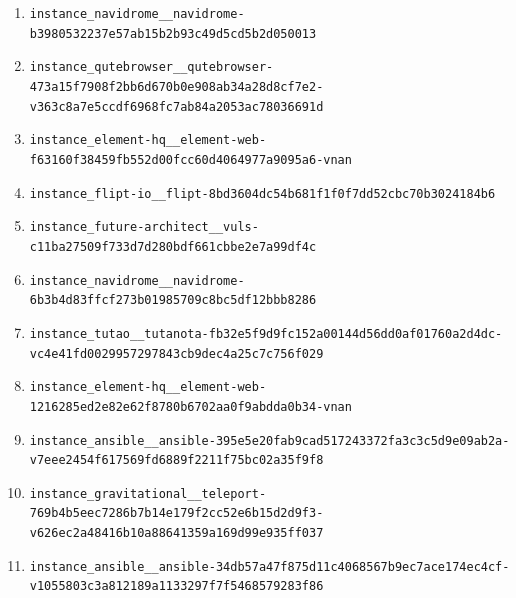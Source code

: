 \begin{enumerate}
\item \texttt{instance\_\allowbreak{}navidrome\_\allowbreak{}\_\allowbreak{}navidrome-\allowbreak{}b3980532237e57\allowbreak{}ab15b2b93c49d5\allowbreak{}cd5b2d050013}
\item \texttt{instance\_\allowbreak{}qutebrowser\_\allowbreak{}\_\allowbreak{}qutebrowser-\allowbreak{}473a15f7908f2b\allowbreak{}b6d670b0e908ab\allowbreak{}34a28d8cf7e2-\allowbreak{}v363c8a7e5ccdf\allowbreak{}6968fc7ab84a20\allowbreak{}53ac78036691d}
\item \texttt{instance\_\allowbreak{}element-\allowbreak{}hq\_\allowbreak{}\_\allowbreak{}element-\allowbreak{}web-\allowbreak{}f63160f38459fb\allowbreak{}552d00fcc60d40\allowbreak{}64977a9095a6-\allowbreak{}vnan}
\item \texttt{instance\_\allowbreak{}flipt-\allowbreak{}io\_\allowbreak{}\_\allowbreak{}flipt-\allowbreak{}8bd3604dc54b68\allowbreak{}1f1f0f7dd52cbc\allowbreak{}70b3024184b6}
\item \texttt{instance\_\allowbreak{}future-\allowbreak{}architect\_\allowbreak{}\_\allowbreak{}vuls-\allowbreak{}c11ba27509f733\allowbreak{}d7d280bdf661cb\allowbreak{}be2e7a99df4c}
\item \texttt{instance\_\allowbreak{}navidrome\_\allowbreak{}\_\allowbreak{}navidrome-\allowbreak{}6b3b4d83ffcf27\allowbreak{}3b01985709c8bc\allowbreak{}5df12bbb8286}
\item \texttt{instance\_\allowbreak{}tutao\_\allowbreak{}\_\allowbreak{}tutanota-\allowbreak{}fb32e5f9d9fc15\allowbreak{}2a00144d56dd0a\allowbreak{}f01760a2d4dc-\allowbreak{}vc4e41fd002995\allowbreak{}7297843cb9dec4\allowbreak{}a25c7c756f029}
\item \texttt{instance\_\allowbreak{}element-\allowbreak{}hq\_\allowbreak{}\_\allowbreak{}element-\allowbreak{}web-\allowbreak{}1216285ed2e82e\allowbreak{}62f8780b6702aa\allowbreak{}0f9abdda0b34-\allowbreak{}vnan}
\item \texttt{instance\_\allowbreak{}ansible\_\allowbreak{}\_\allowbreak{}ansible-\allowbreak{}395e5e20fab9ca\allowbreak{}d517243372fa3c\allowbreak{}3c5d9e09ab2a-\allowbreak{}v7eee2454f6175\allowbreak{}69fd6889f2211f\allowbreak{}75bc02a35f9f8}
\item \texttt{instance\_\allowbreak{}gravitational\_\allowbreak{}\_\allowbreak{}teleport-\allowbreak{}769b4b5eec7286\allowbreak{}b7b14e179f2cc5\allowbreak{}2e6b15d2d9f3-\allowbreak{}v626ec2a48416b\allowbreak{}10a88641359a16\allowbreak{}9d99e935ff037}
\item \texttt{instance\_\allowbreak{}ansible\_\allowbreak{}\_\allowbreak{}ansible-\allowbreak{}34db57a47f875d\allowbreak{}11c4068567b9ec\allowbreak{}7ace174ec4cf-\allowbreak{}v1055803c3a812\allowbreak{}189a1133297f7f\allowbreak{}5468579283f86}

\end{enumerate}
